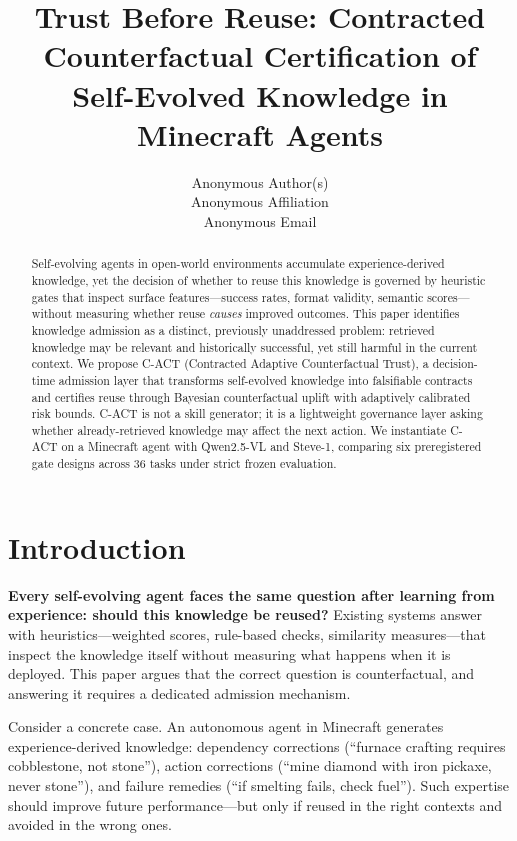 \documentclass[letterpaper]{article}
\title{Trust Before Reuse: Contracted Counterfactual Certification of \\ Self-Evolved Knowledge in Minecraft Agents}
\author{Anonymous Author(s)\\Anonymous Affiliation\\Anonymous Email}
\begin{document}
\maketitle

\begin{abstract}
Self-evolving agents in open-world environments accumulate experience-derived knowledge, yet the decision of whether to reuse this knowledge is governed by heuristic gates that inspect surface features---success rates, format validity, semantic scores---without measuring whether reuse \emph{causes} improved outcomes. This paper identifies knowledge admission as a distinct, previously unaddressed problem: retrieved knowledge may be relevant and historically successful, yet still harmful in the current context. We propose \textsc{C-ACT} (Contracted Adaptive Counterfactual Trust), a decision-time admission layer that transforms self-evolved knowledge into falsifiable contracts and certifies reuse through Bayesian counterfactual uplift with adaptively calibrated risk bounds. \textsc{C-ACT} is not a skill generator; it is a lightweight governance layer asking whether already-retrieved knowledge may affect the next action. We instantiate \textsc{C-ACT} on a Minecraft agent with Qwen2.5-VL and Steve-1, comparing six preregistered gate designs across 36 tasks under strict frozen evaluation.

\end{abstract}

\section{Introduction}

\textbf{Every self-evolving agent faces the same question after learning from experience: should this knowledge be reused?} Existing systems answer with heuristics---weighted scores, rule-based checks, similarity measures---that inspect the knowledge itself without measuring what happens when it is deployed. This paper argues that the correct question is counterfactual, and answering it requires a dedicated admission mechanism.

Consider a concrete case. An autonomous agent in Minecraft generates experience-derived knowledge: dependency corrections (``furnace crafting requires cobblestone, not stone''), action corrections (``mine diamond with iron pickaxe, never stone''), and failure remedies (``if smelting fails, check fuel''). Such expertise should improve future performance---but only if reused in the right contexts and avoided in the wrong ones.
\end{document}

